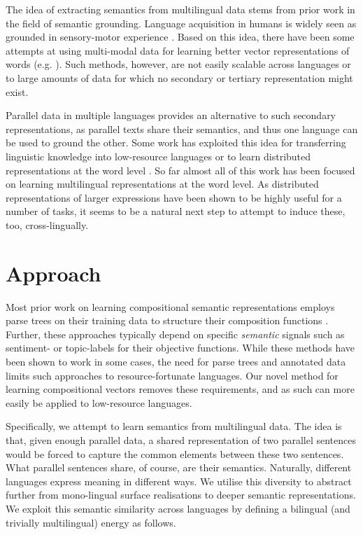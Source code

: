 \documentclass[11pt]{article}
\begin{document}
The idea of extracting semantics from multilingual data stems from prior work in
the field of semantic grounding.  Language acquisition in humans is widely seen
as grounded in sensory-motor experience \cite{Bloom:2001,Roy:2003}.  Based on
this idea, there have been some attempts at using multi-modal data for learning
better vector representations of words (e.g. ).  Such
methods, however, are not easily scalable across languages or to large amounts
of data for which no secondary or tertiary representation might exist.

Parallel data in multiple languages provides an alternative to such secondary
representations, as parallel texts share their semantics, and thus one language
can be used to ground the other.  Some work has exploited this idea for
transferring linguistic knowledge into low-resource languages or to learn
distributed representations at the word level \cite[\textit{inter
    alia}]{Klementiev:2012,Zou:2013,Lauly:2013}.  So far almost all of this
work has been focused on learning multilingual representations at the word
level.  As distributed representations of larger expressions have been shown to
be highly useful for a number of tasks, it seems to be a natural next step to
attempt to induce these, too, cross-lingually.
 \section{Approach}

Most prior work on learning compositional semantic representations employs parse
trees on their training data to structure their composition functions
\cite[\textit{inter alia}]{Socher:2012,Hermann:2013:ACL}. Further, these
approaches typically depend on specific \textit{semantic} signals such as
sentiment- or topic-labels for their objective functions.  While these methods
have been shown to work in some cases, the need for parse trees and annotated
data limits such approaches to resource-fortunate languages. Our novel method
for learning compositional vectors removes these requirements, and as such can
more easily be applied to low-resource languages.

Specifically, we attempt to learn semantics from multilingual data. The idea is
that, given enough parallel data, a shared representation of two parallel
sentences would be forced to capture the common elements between these two
sentences. What parallel sentences share, of course, are their semantics.
Naturally, different languages express meaning in different ways. We utilise
this diversity to abstract further from mono-lingual surface realisations to
deeper semantic representations.  We exploit this semantic similarity across
languages by defining a bilingual (and trivially multilingual) energy as
follows.
\end{document}
